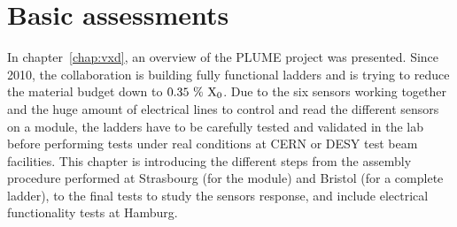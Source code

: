 \chapter{Basic assessments}
\label{chap:labTests}

  In chapter~\ref{chap:vxd}, an overview of the \gls{PLUME} project was presented.
  Since 2010, the collaboration is building fully functional ladders and is trying to reduce the material budget down to $0.35~\%~\rm{X_{0}}$.
  Due to the six sensors working together and the huge amount of electrical lines to control and read the different sensors on a module, the ladders have to be carefully tested and validated in the lab before performing tests under real conditions at \gls{CERN} or \gls{DESY} test beam facilities.
  This chapter is introducing the different steps from the assembly procedure performed at Strasbourg (for the module) and Bristol (for a complete ladder), to the final tests to study the sensors response, and include electrical functionality tests at Hamburg.


